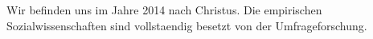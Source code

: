 Wir befinden uns im Jahre 2014 nach Christus.
Die empirischen Sozialwissenschaften sind vollstaendig besetzt von der Umfrageforschung.